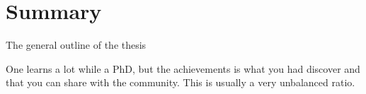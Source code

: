 \clearpage
\chapter*{Summary}
\label{ch:summary}
The general outline of the thesis

\begin{singlespace}
One learns a lot while a PhD, but the achievements is what you had
discover and that you can share with the community. This is usually a very
unbalanced ratio.
\end{singlespace}
